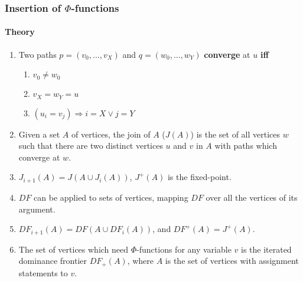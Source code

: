\documentclass[a4paper,12pt, notitlepage]{article}
\renewcommand{\iff}{\textbf{ iff }}
\begin{document}
\subsubsection*{Insertion of $\Phi$-functions}
\paragraph*{Theory}
\begin{enumerate}
\item Two paths $p = (v_0, ..., v_X)$ and $q = (w_0, ..., w_Y)$
\textbf{converge} at $u$ \iff
    \begin{enumerate}
        \item $v_0 \not= w_0$
        \item $v_X = w_Y = u$
        \item $(u_i = v_j) \Rightarrow i = X \lor j = Y$
    \end{enumerate}
\item Given a set $A$ of vertices, the join of $A$ ($J(A)$) is the set of all
vertices $w$ such that there are two distinct vertices $u$ and $v$ in $A$ with
paths which converge at $w$.
\item $J_{i+1}(A) = J(A \cup J_{i}(A))$, $J^+(A)$ is the fixed-point.
\item $DF$ can be applied to sets of vertices, mapping $DF$ over all the
vertices of its argument.
\item $DF_{i+1}(A) = DF(A \cup DF_{i}(A))$, and $DF^+(A) = J^+(A)$.
\item The set of vertices which need $\Phi$-functions for any variable $v$
is the iterated dominance frontier $DF_+(A)$, where $A$ is the set of vertices
with assignment statements to $v$.
\end{enumerate}

\pagebreak
\end{document}
